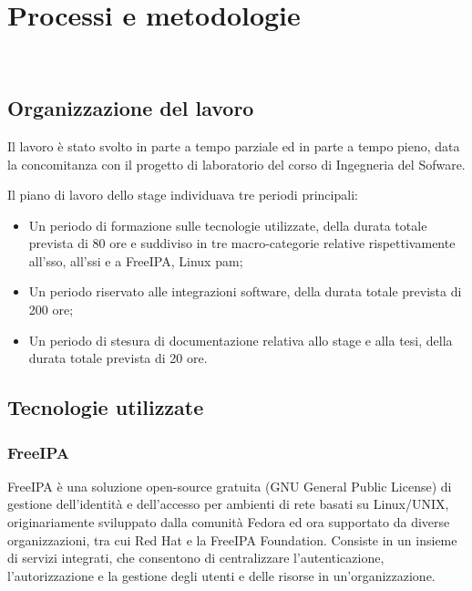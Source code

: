 
\chapter{Processi e metodologie}
\label{cap:processi-metodologie}

\\

\section{Organizzazione del lavoro}

Il lavoro è stato svolto in parte a tempo parziale ed in parte a tempo pieno, data la concomitanza con il progetto di laboratorio del corso di Ingegneria del Sofware. 

Il piano di lavoro dello stage individuava tre periodi principali:

\begin{itemize}
    \item Un periodo di formazione sulle tecnologie utilizzate, della durata totale prevista di 80 ore e suddiviso in tre macro-categorie relative rispettivamente all'\acrshort{sso}, all'\acrshort{ssi} e a FreeIPA, Linux \acrshort{pam};
    \item Un periodo riservato alle integrazioni software, della durata totale prevista di 200 ore;
    \item Un periodo di stesura di documentazione relativa allo stage e alla tesi, della durata totale prevista di 20 ore.
\end{itemize}




\section{Tecnologie utilizzate}
\subsection{FreeIPA}
FreeIPA è una soluzione open-source gratuita (GNU General Public License) di gestione dell'identità e dell'accesso per ambienti di rete basati su Linux/UNIX, originariamente sviluppato dalla comunità Fedora ed ora supportato da diverse organizzazioni, tra cui Red Hat e la FreeIPA Foundation. Consiste in un insieme di servizi integrati, che consentono di centralizzare l'autenticazione, l'autorizzazione e la gestione degli utenti e delle risorse in un'organizzazione.


